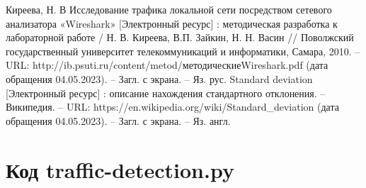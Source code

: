 \documentclass[bachelor, och, coursework]{SCWorks}
\begin{document}
\begin{thebibliography}{15}
    Киреева, Н. В Исследование трафика локальной сети посредством сетевого анализатора «Wireshark» [Электронный ресурс] : методическая разработка к лабораторной работе / Н. В. Киреева, В.П. Зайкин, Н. Н. Васин // Поволжский государственный университет телекоммуникаций и информатики, Самара, 2010. -- URL: http://ib.psuti.ru/content/metod/методическиеWireshark.pdf (дата обращения 04.05.2023). -- Загл. с экрана. -- Яз. рус.
    Standard deviation [Электронный ресурс] : описание нахождения стандартного отклонения. -- Википедия. -- URL: https://en.wikipedia.org/wiki/Standard_deviation (дата обращения 04.05.2023). -- Загл. с экрана. -- Яз. англ.
  \end{thebibliography}

  \appendix

    \section{Код traffic-detection.py}
    \inputminted[fontsize=\footnotesize, linenos]{Python}{code/traffic-detection.py}
\end{document}
